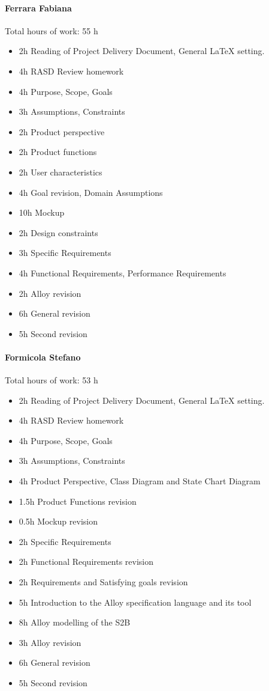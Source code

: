 \documentclass{report}
\begin{document}
		\paragraph{Ferrara Fabiana} Total hours of work: 55 h
			\begin{itemize}
				\item 2h Reading of Project Delivery Document, General LaTeX setting.
				\item 4h RASD Review homework
				\item 4h Purpose, Scope, Goals
				\item 3h Assumptions, Constraints
				\item 2h Product perspective
				\item 2h Product functions
				\item 2h User characteristics
				\item 4h Goal revision, Domain Assumptions
				\item 10h Mockup
				\item 2h Design constraints
				\item 3h Specific Requirements
				\item 4h Functional Requirements, Performance Requirements
				\item 2h Alloy revision
				\item 6h General revision
				\item 5h Second revision
			\end{itemize}
		\paragraph{Formicola Stefano} Total hours of work: 53 h
			\begin{itemize}
				\item 2h Reading of Project Delivery Document, General LaTeX setting.
				\item 4h RASD Review homework
				\item 4h Purpose, Scope, Goals
				\item 3h Assumptions, Constraints
				\item 4h Product Perspective, Class Diagram and State Chart Diagram
				\item 1.5h Product Functions revision
				\item 0.5h Mockup revision
				\item 2h Specific Requirements
				\item 2h Functional Requirements revision
				\item 2h Requirements and Satisfying goals revision
				\item 5h Introduction to the Alloy specification language and its tool
				\item 8h Alloy modelling of the S2B
				\item 3h Alloy revision
				\item 6h General revision
				\item 5h Second revision
			\end{itemize}
\end{document}
